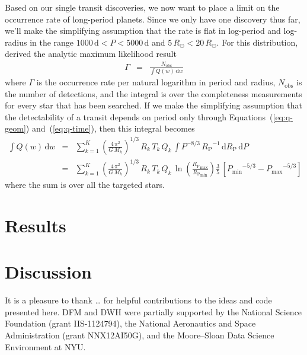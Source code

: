 \documentclass[12pt,preprint]{aastex}
\renewcommand{\eqref}[1]{\ref{eq:#1}}
\newcommand{\dd}{\ensuremath{\,\mathrm{d}}}
\newcommand{\period}{{\ensuremath{P}}}
\newcommand{\rp}{{\ensuremath{R_\mathrm{P}}}}
\newcommand{\rate}{{\ensuremath{\Gamma}}}
\begin{document}
Based on our single transit discoveries, we now want to place a limit on
the occurrence rate of long-period planets.
Since we only have one discovery thus far, we'll make the simplifying
assumption that the rate is flat in log-period and log-radius in the range
$1000\,\mathrm{d} < \period < 5000\,\mathrm{d}$ and $5\,R_\odot <
20\,R_\odot$.
For this distribution, \citet{Foreman-Mackey:2014} derived the analytic
maximum likelihood result
\begin{eqnarray}
\rate &=& \frac{N_\mathrm{obs}}{\int Q(w)\dd w}
\end{eqnarray}
where $\rate$ is the occurrence rate per natural logarithm in period and
radius, $N_\mathrm{obs}$ is the number of detections, and the integral is over
the completeness measurements for every star that has been searched.
If we make the simplifying assumption that the detectability of a transit
depends on period only through Equations~(\eqref{q-geom})
and~(\eqref{q-time}), then this integral becomes
\begin{eqnarray}
\int Q(w)\dd w &=& \sum_{k=1}^K
    \left( \frac{4\,\pi^2}{G\,M_k} \right)^{1/3} \, R_k \, T_k \, Q_k \,
    \int \period^{-8/3}\,\rp^{-1} \dd\rp\dd\period \\
 &=& \sum_{k=1}^K
    \left( \frac{4\,\pi^2}{G\,M_k} \right)^{1/3} \, R_k \, T_k \, Q_k \,
    \ln \left(\frac{\rp_\mathrm{max}}{\rp_\mathrm{min}}\right)
    \frac{3}{5} \,
    \left[{\period_\mathrm{min}}^{-5/3} - {\period_\mathrm{max}}^{-5/3}\right]
\end{eqnarray}
where the sum is over all the targeted stars.

\section{Results}


\section{Discussion}


\acknowledgments
It is a pleasure to thank
\ldots
for helpful contributions to the ideas and code presented here.
DFM and DWH were partially supported by the National Science Foundation
(grant IIS-1124794),
the National Aeronautics and Space Administration
(grant NNX12AI50G), and the Moore--Sloan Data Science Environment at NYU.
\end{document}
